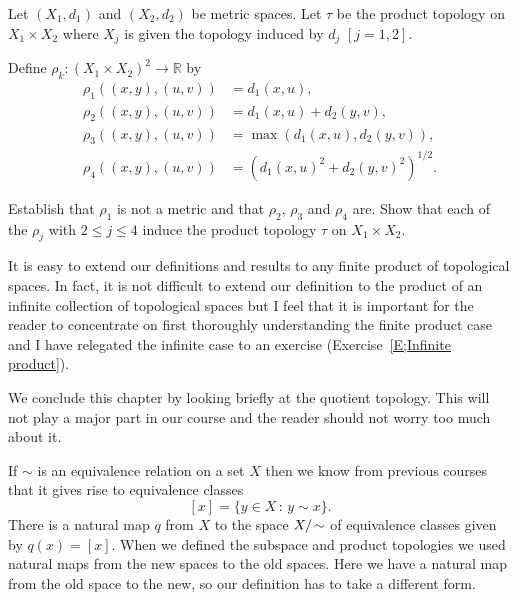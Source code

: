 \begin{problem}\label{E;metric product}
Let $(X_{1},d_{1})$ and $(X_{2},d_{2})$ be metric
spaces. Let $\tau$ be the product topology on $X_{1}\times X_{2}$
where $X_{j}$ is given the topology induced by $d_{j}$ $[j=1,2]$.

Define $\rho_{k}:(X_{1}\times X_{2})^{2}\rightarrow {\mathbb R}$
by
\begin{align*}
\rho_{1}((x,y),(u,v))&=d_{1}(x,u),\\
\rho_{2}((x,y),(u,v))&=d_{1}(x,u)+d_{2}(y,v),\\
\rho_{3}((x,y),(u,v))&=\max(d_{1}(x,u),d_{2}(y,v)),\\
\rho_{4}((x,y),(u,v))&=(d_{1}(x,u)^{2}+d_{2}(y,v)^{2})^{1/2}.
\end{align*}

Establish that $\rho_{1}$ is not a metric
and that $\rho_{2}$, $\rho_{3}$ and $\rho_{4}$ are.
Show that each of the $\rho_{j}$ with $2\leq j\leq 4$ induce the
product topology $\tau$ on $X_{1}\times X_{2}$.
\end{problem}
It is easy to extend our definitions and results to
any finite product of topological spaces. In fact,
it is not difficult to extend our definition
to the product of an infinite collection
of topological spaces but I feel
that it is important for the reader to concentrate on
first thoroughly
understanding the finite product case and I have relegated the
infinite case to an exercise (Exercise~\ref{E;Infinite product}).

We conclude this chapter by looking briefly at the
quotient topology. This will not play a major part in
our course and the reader should not worry too much about it.

If $\sim$ is an equivalence relation on a
set $X$
then we know from previous courses that it gives
rise to equivalence classes
\[[x]=\{y\in X\,:\,y\sim x\}.\]
There is a natural map $q$ from $X$ to the space $X/\negthinspace\sim$
of equivalence classes given by $q(x)=[x]$. When
we defined the subspace and product topologies
we used natural maps from the new spaces to the
old spaces. Here we have a natural map from
the old space to the new, so our definition
has to take a different form.

